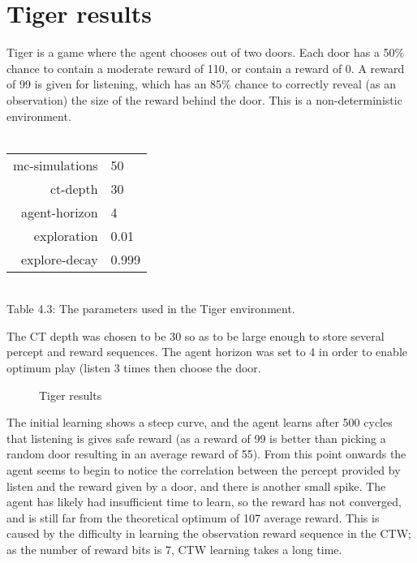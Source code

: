 \documentclass[pdftex,twoside,a4paper]{report}
\begin{document}
\section{Tiger results}
Tiger is a game where the agent chooses out of two doors. Each door has a 50\% chance to contain a moderate reward of 110, or contain a reward of 0. A reward of 99 is given for listening, which has an 85\% chance to correctly reveal (as an observation) the size of the reward behind the door. This is a non-deterministic environment.\\\\
\begin{center}
\begin{tabular}{| r | l | }
\hline
mc-simulations & 50\\
ct-depth & 30\\
agent-horizon & 4\\
exploration & 0.01\\
explore-decay & 0.999\\
\hline
\end{tabular}\\
\vspace{0.5mm}
Table 4.3: The parameters used in the Tiger environment.
\end{center}
The CT depth was chosen to be 30 so as to be large enough to store several percept and reward sequences. The agent horizon was set to 4 in order to enable optimum play (listen 3 times then choose the door.

 \begin{figure}[h]
   \begin{center}
   \end{center}
   \caption{Tiger results}
   \label{fig:tiger_results}
 \end{figure}
The initial learning shows a steep curve, and the agent learns after 500 cycles that listening is gives safe reward (as a reward of 99 is better than picking a random door resulting in an average reward of 55). From this point onwards the agent seems to begin to notice the correlation between the percept provided by listen and the reward given by a door, and there is another small spike. The agent has likely had insufficient time to learn, so the reward has not converged, and is still far from the theoretical optimum of 107 average reward. This is caused by the difficulty in learning the observation reward sequence in the CTW; as the number of reward bits is 7, CTW learning takes a long time.
\end{document}
